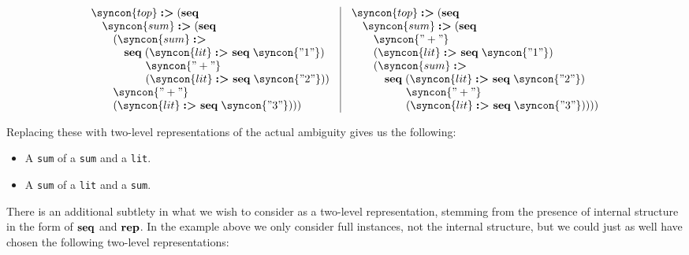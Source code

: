 \documentclass{kththesis}
\begin{document}
$$
\begin{array}{l|l}
\begin{array}{l}
\syncon{top} \tagged (\seq \\
\quad \syncon{sum} \tagged (\seq \\
\qquad (\syncon{sum} \tagged \\
\qquad \quad \seq (\syncon{lit} \tagged\ \seq \syncon{"1"}) \\
\qquad \quad \hphantom{\seq}\ \syncon{"+"} \\
\qquad \quad \hphantom{\seq}\ (\syncon{lit} \tagged\ \seq \syncon{"2"})) \\
\qquad \syncon{"+"} \\
\qquad (\syncon{lit} \tagged\ \seq \syncon{"3"}))) \\
\end{array}
&
\begin{array}{l}
\syncon{top} \tagged (\seq \\
\quad \syncon{sum} \tagged (\seq \\
\qquad \syncon{"+"} \\
\qquad (\syncon{lit} \tagged\ \seq \syncon{"1"}) \\
\qquad (\syncon{sum} \tagged \\
\qquad \quad \seq (\syncon{lit} \tagged\ \seq \syncon{"2"}) \\
\qquad \quad \hphantom{\seq}\ \syncon{"+"} \\
\qquad \quad \hphantom{\seq}\ (\syncon{lit} \tagged\ \seq \syncon{"3"})))) \\
\end{array}
\end{array}
$$

Replacing these with two-level representations of the actual ambiguity gives us the following:

\begin{itemize}
  \item A \texttt{sum} of a \texttt{sum} and a \texttt{lit}.
  \item A \texttt{sum} of a \texttt{lit} and a \texttt{sum}.
\end{itemize}

There is an additional subtlety in what we wish to consider as a two-level representation, stemming from the presence of internal structure in the form of $\mathrel{\mathbf{seq}}$ and $\mathrel{\mathbf{rep}}$. In the example above we only consider full instances, not the internal structure, but we could just as well have chosen the following two-level representations:
\end{document}
